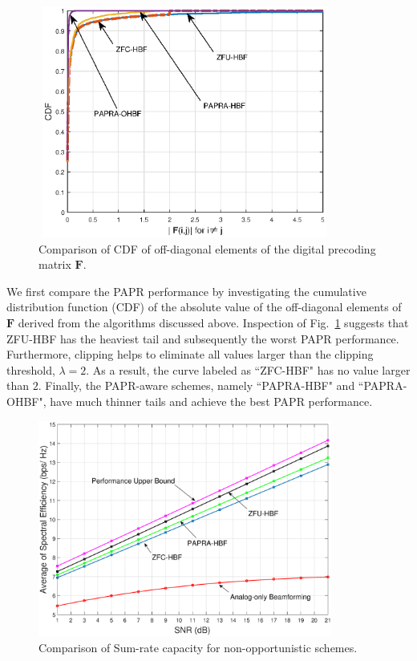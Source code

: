\documentclass[conference]{IEEEtran}
\begin{document}
\begin{figure}[ht]
	\begin{center}
		\includegraphics[width=3.8in,height=3in]{Figure/cdf2.eps}
		\caption{Comparison of CDF of off-diagonal elements of the digital precoding matrix ${\bm F}$.}\label{fig:CDF}
	\end{center}
\end{figure}

We first compare the PAPR performance by investigating the cumulative distribution function (CDF) of the absolute value of the off-diagonal elements of ${\bm F}$ derived from the algorithms discussed above. Inspection of Fig.~\ref{fig:CDF} suggests that ZFU-HBF has the heaviest tail and subsequently the worst PAPR performance. Furthermore, clipping helps to eliminate all values larger than the clipping threshold, {\em $\lambda=2$}. As a result, the curve labeled as ``ZFC-HBF" has no value larger than $2$. Finally, the PAPR-aware schemes, namely ``PAPRA-HBF" and ``PAPRA-OHBF", have much thinner tails and achieve the best PAPR performance.

\begin{figure}[ht]
	\begin{center}
		\includegraphics[width=3.8in,height=2.8in]{Figure/SpectralEffNoSelection3.eps}
		\caption{Comparison of Sum-rate capacity for non-opportunistic schemes.}\label{fig:SpectralEffNoSelection}
	\end{center}
\end{figure}
\end{document}
